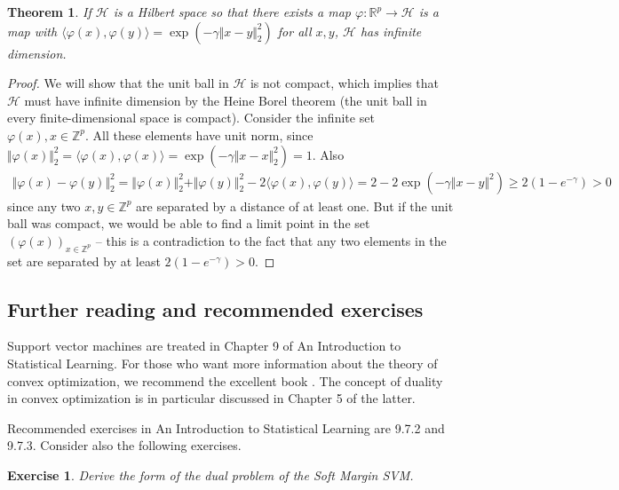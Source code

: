 \documentclass{article}
\newcommand{\calH}{\mathcal{H}}
\newcommand{\sprod}[1]{\langle #1 \rangle}
\newcommand{\R}{\mathbb{R}}
\newcommand{\Z}{\mathbb{Z}}
\newtheorem{theorem}{Theorem}
\newtheorem{exercise}{Exercise}
\newcommand{\norm}[1]{\Vert #1 \Vert}
\begin{document}
\begin{theorem}
    If $\calH$ is a Hilbert space so that there exists a map $\varphi:\R^p\to \calH$ is a map with $\sprod{\varphi(x),\varphi(y)} = \exp(-\gamma \norm{x-y}_2^2)$ for all $x,y$, $\calH$ has infinite dimension.
\end{theorem}
\begin{proof}
    We will show that the unit ball in $\calH$ is not compact, which implies that $\calH$ must have infinite dimension by the Heine Borel theorem (the unit ball in every finite-dimensional space is compact). Consider the infinite set $\varphi(x), x\in \Z^p$. All these elements have unit norm, since $\norm{\varphi(x)}_2^2=\sprod{\varphi(x),\varphi(x)}=\exp(-\gamma \norm{x-x}_2^2)=1$. Also
    \begin{align*}
        \norm{\varphi(x)-\varphi(y)}_2^2 = \norm{\varphi(x)}_2^2+\norm{\varphi(y)}_2^2 - 2\sprod{\varphi(x),\varphi(y)} = 2 - 2\exp(-\gamma\norm{x-y}^2)\geq 2(1-e^{-\gamma})>0
    \end{align*}
    since any two $x,y\in \Z^p$ are separated by a distance of at least one. But if the unit ball was compact, we would be able to find a limit point in the set $(\varphi(x))_{x\in \Z^p}$ -- this is a contradiction to the fact that any two elements in the set are separated by at least $2(1-e^{-\gamma})>0$.
\end{proof}


\subsection{Further reading and recommended exercises}

Support vector machines are treated in Chapter 9 of An Introduction to Statistical Learning. For those who want more information about the theory of convex optimization, we recommend the excellent book \cite{boyd2004convex}. The concept of duality in convex optimization is in particular discussed in Chapter 5 of the latter.


Recommended exercises in An Introduction to Statistical Learning are 9.7.2 and 9.7.3. Consider also the following exercises.

\begin{exercise}
    Derive the form of the dual problem of the Soft Margin SVM.
\end{exercise}
\end{document}
